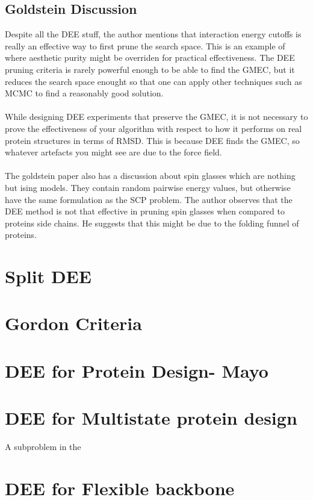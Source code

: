 \documentclass[a4]{article}
\begin{document}
\subsection{Goldstein Discussion}
Despite all the DEE stuff, the author mentions that interaction energy cutoffs is really an effective way to first prune the search space. This is an example of where aesthetic purity might be overriden for practical effectiveness. The DEE pruning criteria is rarely powerful enough to be able to find the GMEC, but it reduces the search space enought so that one can apply other techniques such as MCMC to find a reasonably good solution. 
\\
\\
While designing DEE experiments that preserve the GMEC, it is not necessary to prove the effectiveness of your algorithm with respect to how it performs on real protein structures in terms of RMSD. This is because DEE finds the GMEC, so whatever artefacts you might see are due to the force field. 
\\
\\
The goldstein paper also has a discussion about spin glasses which are nothing but ising models. They contain random pairwise energy values, but otherwise have the same formulation as the SCP problem. The author observes that the DEE method is not that effective in pruning spin glasses when compared to proteins side chains. He suggests that this might be due to the folding funnel of proteins.

\section{Split DEE}

\section{Gordon Criteria}

\section{DEE for Protein Design- Mayo}

\section{DEE for Multistate protein design}
A subproblem in the 

\section{DEE for Flexible backbone}
\end{document}
